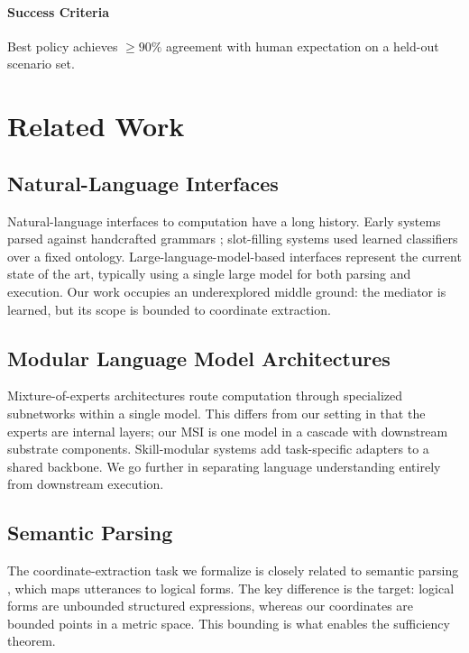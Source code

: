 \documentclass[11pt,twocolumn,a4paper]{article}
\theoremstyle{definition}
\theoremstyle{remark}
\begin{document}
\paragraph{Success Criteria}
Best policy achieves $\geq 90\%$ agreement with human expectation on a held-out scenario set.

\section{Related Work}
\label{sec:related}

\subsection{Natural-Language Interfaces}

Natural-language interfaces to computation have a long history. Early systems parsed against handcrafted grammars \citep{winograd1971shrdlu}; slot-filling systems used learned classifiers over a fixed ontology. Large-language-model-based interfaces \citep{brown2020gpt3, schick2024toolformer, yao2022react} represent the current state of the art, typically using a single large model for both parsing and execution. Our work occupies an underexplored middle ground: the mediator is learned, but its scope is bounded to coordinate extraction.

\subsection{Modular Language Model Architectures}

Mixture-of-experts architectures \citep{shazeer2017outrageously, fedus2022switch} route computation through specialized subnetworks within a single model. This differs from our setting in that the experts are internal layers; our MSI is one model in a cascade with downstream substrate components. Skill-modular systems \citep{houlsby2019parameter} add task-specific adapters to a shared backbone. We go further in separating language understanding entirely from downstream execution.

\subsection{Semantic Parsing}

The coordinate-extraction task we formalize is closely related to semantic parsing \citep{liang2016semantic}, which maps utterances to logical forms. The key difference is the target: logical forms are unbounded structured expressions, whereas our coordinates are bounded points in a metric space. This bounding is what enables the sufficiency theorem.
\end{document}
